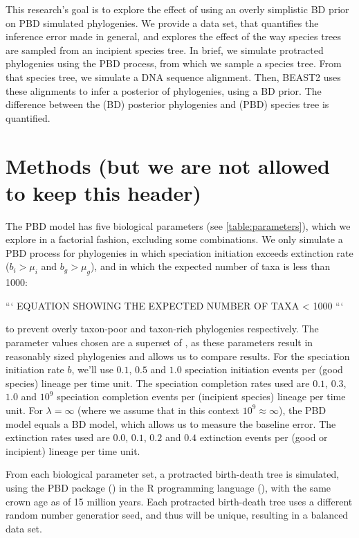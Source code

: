 \documentclass{article}
\begin{document}
This research's goal is to explore the effect of using an overly simplistic
BD prior on PBD simulated phylogenies. We provide a data set, 
that quantifies the inference error made in general, and explores
the effect of the way species trees are sampled from an incipient species tree.  
In brief, we simulate protracted phylogenies using the PBD process,
from which we sample a species tree. From that species tree, 
we simulate a DNA sequence alignment. Then, BEAST2 uses these alignments
to infer a posterior of phylogenies, using a BD prior. The difference
between the (BD) posterior phylogenies and (PBD) species tree is quantified.

\section{Methods (but we are not allowed to keep this header)}

The PBD model has five biological parameters (see \ref{table:parameters}), 
which we explore in a factorial fashion, excluding some combinations. 
We only simulate a PBD process for phylogenies in which
speciation initiation exceeds extinction rate ($b_i > \mu_i$ and $b_g > \mu_g$),
and in which the expected number of taxa is less than 1000:

```
EQUATION SHOWING THE EXPECTED NUMBER OF TAXA < 1000
```

to prevent overly taxon-poor and taxon-rich phylogenies respectively.
The parameter values chosen are a 
superset of \cite{etienne2014}, as these parameters result in reasonably
sized phylogenies and allows us to compare results. 
For the speciation initiation rate $b$, we'll use $0.1$, $0.5$ and $1.0$ 
speciation initiation events per (good species) lineage per time unit.
The speciation completion rates used are $0.1$, $0.3$, $1.0$ and $10^9$ speciation completion
events per (incipient species) lineage per time unit. For 
$\lambda = \infty$ (where we assume that in this context $10^9 \approx \infty$), 
the PBD model equals a BD model, which allows us to measure the baseline error.
The extinction rates used are $0.0$, $0.1$, $0.2$ and $0.4$ 
extinction events per (good or incipient) lineage per time unit.

From each biological parameter set, a protracted birth-death tree is simulated,
using the PBD package (\cite{pbd}) in the R programming language (\cite{r}), 
with the same crown age as \cite{etienne2014} of 15 million years. 
Each protracted birth-death tree uses a different random number
generatior seed, and thus will be unique, resulting in a balanced 
data set. 
\end{document}
